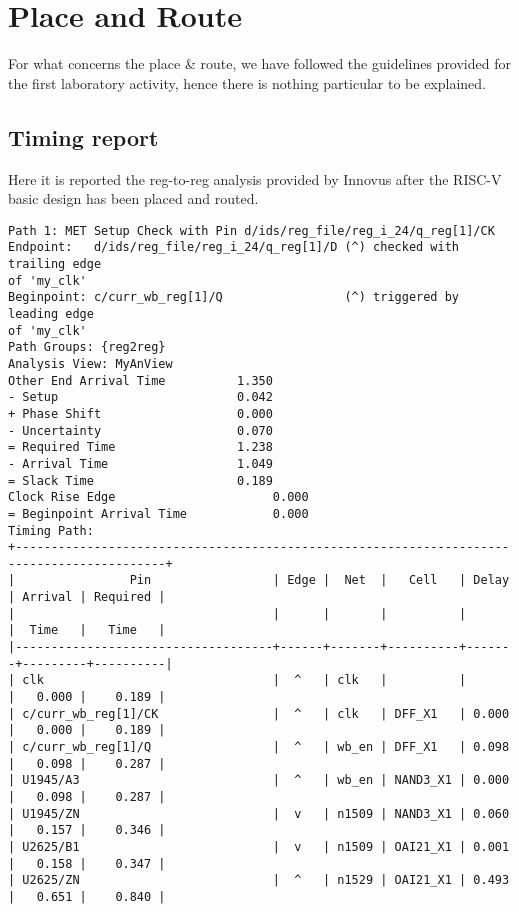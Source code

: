 \chapter{Place and Route}

For what concerns the place \& route, we have followed the guidelines provided for the first laboratory activity, hence there is nothing particular to be explained.

\section{Timing report}

Here it is reported the reg-to-reg analysis provided by Innovus after the RISC-V basic design has been placed and routed.

\begin{Verbatim}[fontsize=\small]
Path 1: MET Setup Check with Pin d/ids/reg_file/reg_i_24/q_reg[1]/CK 
Endpoint:   d/ids/reg_file/reg_i_24/q_reg[1]/D (^) checked with trailing edge 
of 'my_clk'
Beginpoint: c/curr_wb_reg[1]/Q                 (^) triggered by  leading edge 
of 'my_clk'
Path Groups: {reg2reg}
Analysis View: MyAnView
Other End Arrival Time          1.350
- Setup                         0.042
+ Phase Shift                   0.000
- Uncertainty                   0.070
= Required Time                 1.238
- Arrival Time                  1.049
= Slack Time                    0.189
Clock Rise Edge                      0.000
= Beginpoint Arrival Time            0.000
Timing Path:
+-------------------------------------------------------------------------------------------+ 
|                Pin                 | Edge |  Net  |   Cell   | Delay | Arrival | Required | 
|                                    |      |       |          |       |  Time   |   Time   | 
|------------------------------------+------+-------+----------+-------+---------+----------| 
| clk                                |  ^   | clk   |          |       |   0.000 |    0.189 | 
| c/curr_wb_reg[1]/CK                |  ^   | clk   | DFF_X1   | 0.000 |   0.000 |    0.189 | 
| c/curr_wb_reg[1]/Q                 |  ^   | wb_en | DFF_X1   | 0.098 |   0.098 |    0.287 | 
| U1945/A3                           |  ^   | wb_en | NAND3_X1 | 0.000 |   0.098 |    0.287 | 
| U1945/ZN                           |  v   | n1509 | NAND3_X1 | 0.060 |   0.157 |    0.346 | 
| U2625/B1                           |  v   | n1509 | OAI21_X1 | 0.001 |   0.158 |    0.347 | 
| U2625/ZN                           |  ^   | n1529 | OAI21_X1 | 0.493 |   0.651 |    0.840 | 

\end{Verbatim}
